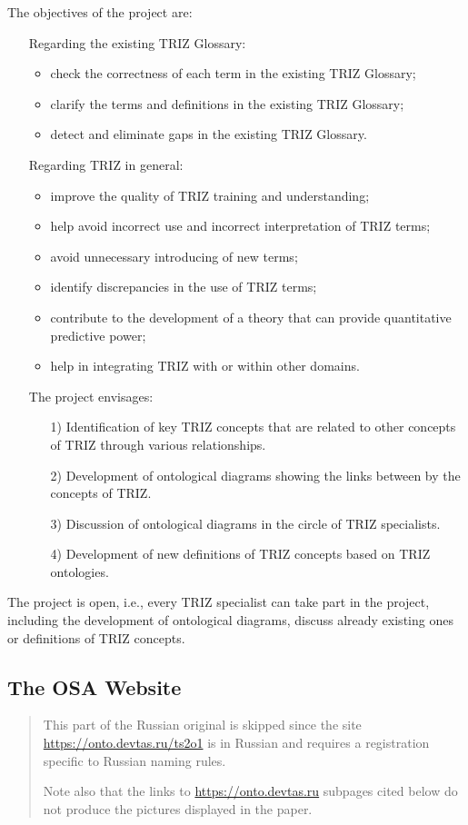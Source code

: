 \documentclass[11pt,a4paper]{article}
\begin{document}
The objectives of the project are:
\begin{itemize}
\item[] Regarding the existing TRIZ Glossary:
  \begin{itemize}[noitemsep]
  \item check the correctness of each term in the existing TRIZ Glossary;
  \item clarify the terms and definitions in the existing TRIZ Glossary;
  \item detect and eliminate gaps in the existing TRIZ Glossary.
  \end{itemize}
\item[] Regarding TRIZ in general:
  \begin{itemize}[noitemsep]
  \item improve the quality of TRIZ training and understanding;
  \item help avoid incorrect use and incorrect interpretation of TRIZ terms;
  \item avoid unnecessary introducing of new terms;
  \item identify discrepancies in the use of TRIZ terms;
  \item contribute to the development of a theory that can provide
    quantitative predictive power;
  \item help in integrating TRIZ with or within other domains.
  \end{itemize}
\item[] The project envisages:
  \begin{itemize}[noitemsep]
  \item[1)] Identification of key TRIZ concepts that are related to other
    concepts of TRIZ through various relationships.
  \item[2)] Development of ontological diagrams showing the links between by
    the concepts of TRIZ.
  \item[3)] Discussion of ontological diagrams in the circle of TRIZ
    specialists.
  \item[4)] Development of new definitions of TRIZ concepts based on TRIZ
    ontologies.
  \end{itemize}
\end{itemize}
The project is open, i.e., every TRIZ specialist can take part in the project,
including the development of ontological diagrams, discuss already existing
ones or definitions of TRIZ concepts.

\subsection{The OSA Website}
\begin{quote}  
  This part of the Russian original is skipped since the site
  \url{https://onto.devtas.ru/ts2o1} is in Russian and requires a registration
  specific to Russian naming rules.

  Note also that the links to \url{https://onto.devtas.ru} subpages cited
  below do not produce the pictures displayed in the paper.
\end{quote}
\end{document}
